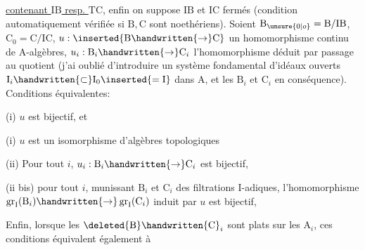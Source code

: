 
\uline{contenant $\mathrm{IB}$ resp. $\mathrm{TC}$}\handwritten{$] /^{\circ}$}, enfin on suppose $\mathrm{IB}$ et $\mathrm{IC}$ fermés (condition automatiquement vérifiée si $\mathrm B,\mathrm C$ sont noethériens). Soient $\mathrm B_{\unsure{0|o}}=\mathrm B/\mathrm{IB}$, $\mathrm C_0=\mathrm C/\mathrm{IC}$, $u:\inserted{\mathrm B\handwritten{\to}\mathrm C}$ un homomorphisme continu de $\mathrm A$-algèbres, $u_i:\mathrm B_i\handwritten{\to}\mathrm C_i$ l’homomorphisme  déduit par passage au quotient (j’ai oublié d’introduire un système fondamental d’idéaux ouverts $\mathrm I_i\handwritten{\subset}\mathrm I_0\inserted{=\mathrm I}$ dans $\mathrm A$, et les $\mathrm B_i$ et $\mathrm C_i$ en conséquence). Conditions équivalentes:

(i) $u$ est  bijectif, et \handwritten{$\uparrow$}

\handwritten{$\curvearrowright$}(i) $u$ est un isomorphisme d’algèbres topologiques

(ii) Pour tout $i$, $u_i:\mathrm B_i\handwritten{\to}\mathrm C_i$ est bijectif, \handwritten{$\uparrow$}

(ii bis) pour tout $i$, munissant $\mathrm B_i$ et $\mathrm C_i$ des filtrations $\mathrm I$-adiques, l’homomorphisme $\operatorname{gr}_{\mathrm I}(\mathrm B_i)\handwritten{\to}\operatorname{gr}_{\mathrm I}(\mathrm C_i)$ induit par $u$ est bijectif, \handwritten{$\uparrow$}

Enfin, lorsque les $\deleted{\mathrm B}\handwritten{\mathrm C}_i$ sont plats sur les $\mathrm A_i$, ces conditions équivalent également à

